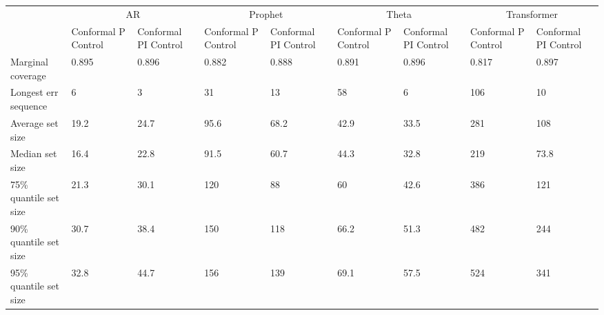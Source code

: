 \begin{tabular}{lllllllll}
\toprule
& \multicolumn{2}{c}{AR}& \multicolumn{2}{c}{Prophet}& \multicolumn{2}{c}{Theta}& \multicolumn{2}{c}{Transformer} \\
& Conformal P Control & Conformal PI Control & Conformal P Control & Conformal PI Control & Conformal P Control & Conformal PI Control & Conformal P Control & Conformal PI Control \\
\midrule
Marginal coverage & 0.895 & 0.896 & 0.882 & 0.888 & 0.891 & 0.896 & 0.817 & 0.897 \\
Longest err sequence & 6 & 3 & 31 & 13 & 58 & 6 & 106 & 10 \\
Average set size & 19.2 & 24.7 & 95.6 & 68.2 & 42.9 & 33.5 & 281 & 108 \\
Median set size & 16.4 & 22.8 & 91.5 & 60.7 & 44.3 & 32.8 & 219 & 73.8 \\
75\% quantile set size & 21.3 & 30.1 & 120 & 88 & 60 & 42.6 & 386 & 121 \\
90\% quantile set size & 30.7 & 38.4 & 150 & 118 & 66.2 & 51.3 & 482 & 244 \\
95\% quantile set size & 32.8 & 44.7 & 156 & 139 & 69.1 & 57.5 & 524 & 341 \\
\bottomrule
\end{tabular}
